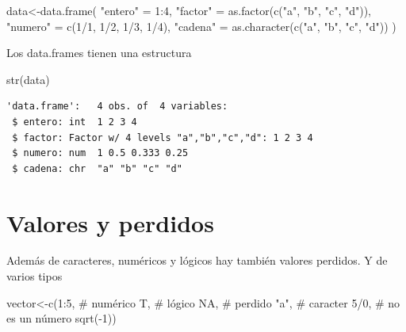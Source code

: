 \documentclass[
  letterpaper,
  DIV=11,
  numbers=noendperiod]{scrreprt}
\newenvironment{Shaded}{\begin{snugshade}}{\end{snugshade}}
\newcommand{\CommentTok}[1]{\textcolor[rgb]{0.37,0.37,0.37}{#1}}
\newcommand{\ConstantTok}[1]{\textcolor[rgb]{0.56,0.35,0.01}{#1}}
\newcommand{\DecValTok}[1]{\textcolor[rgb]{0.68,0.00,0.00}{#1}}
\newcommand{\FunctionTok}[1]{\textcolor[rgb]{0.28,0.35,0.67}{#1}}
\newcommand{\NormalTok}[1]{\textcolor[rgb]{0.00,0.23,0.31}{#1}}
\newcommand{\OtherTok}[1]{\textcolor[rgb]{0.00,0.23,0.31}{#1}}
\newcommand{\SpecialCharTok}[1]{\textcolor[rgb]{0.37,0.37,0.37}{#1}}
\newcommand{\StringTok}[1]{\textcolor[rgb]{0.13,0.47,0.30}{#1}}
\begin{document}
\begin{Shaded}
\begin{Highlighting}[]
\NormalTok{data}\OtherTok{\textless{}{-}}\FunctionTok{data.frame}\NormalTok{(}
  \StringTok{"entero"} \OtherTok{=} \DecValTok{1}\SpecialCharTok{:}\DecValTok{4}\NormalTok{, }
  \StringTok{"factor"} \OtherTok{=} \FunctionTok{as.factor}\NormalTok{(}\FunctionTok{c}\NormalTok{(}\StringTok{"a"}\NormalTok{, }\StringTok{"b"}\NormalTok{, }\StringTok{"c"}\NormalTok{, }\StringTok{"d"}\NormalTok{)), }
  \StringTok{"numero"} \OtherTok{=} \FunctionTok{c}\NormalTok{(}\DecValTok{1}\SpecialCharTok{/}\DecValTok{1}\NormalTok{, }\DecValTok{1}\SpecialCharTok{/}\DecValTok{2}\NormalTok{, }\DecValTok{1}\SpecialCharTok{/}\DecValTok{3}\NormalTok{, }\DecValTok{1}\SpecialCharTok{/}\DecValTok{4}\NormalTok{),}
  \StringTok{"cadena"} \OtherTok{=} \FunctionTok{as.character}\NormalTok{(}\FunctionTok{c}\NormalTok{(}\StringTok{"a"}\NormalTok{, }\StringTok{"b"}\NormalTok{, }\StringTok{"c"}\NormalTok{, }\StringTok{"d"}\NormalTok{))}
\NormalTok{)}
\end{Highlighting}
\end{Shaded}

Los data.frames tienen una estructura

\begin{Shaded}
\begin{Highlighting}[]
\FunctionTok{str}\NormalTok{(data)}
\end{Highlighting}
\end{Shaded}

\begin{verbatim}
'data.frame':   4 obs. of  4 variables:
 $ entero: int  1 2 3 4
 $ factor: Factor w/ 4 levels "a","b","c","d": 1 2 3 4
 $ numero: num  1 0.5 0.333 0.25
 $ cadena: chr  "a" "b" "c" "d"
\end{verbatim}

\hypertarget{valores-y-perdidos}{%
\section{Valores y perdidos}\label{valores-y-perdidos}}

Además de caracteres, numéricos y lógicos hay también valores perdidos.
Y de varios tipos

\begin{Shaded}
\begin{Highlighting}[]
\NormalTok{vector}\OtherTok{\textless{}{-}}\FunctionTok{c}\NormalTok{(}\DecValTok{1}\SpecialCharTok{:}\DecValTok{5}\NormalTok{, }\CommentTok{\# numérico}
\NormalTok{          T, }\CommentTok{\# lógico}
          \ConstantTok{NA}\NormalTok{, }\CommentTok{\# perdido}
          \StringTok{"a"}\NormalTok{, }\CommentTok{\# caracter}
          \DecValTok{5}\SpecialCharTok{/}\DecValTok{0}\NormalTok{, }\CommentTok{\# no es un número}
          \FunctionTok{sqrt}\NormalTok{(}\SpecialCharTok{{-}}\DecValTok{1}\NormalTok{))}
\end{Highlighting}
\end{Shaded}
\end{document}
